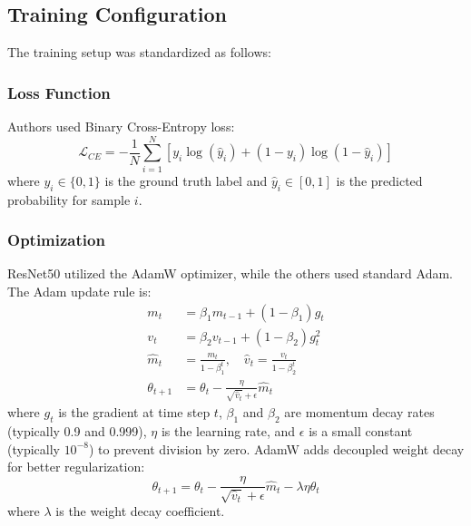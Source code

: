 \documentclass[conference]{IEEEtran}
\begin{document}
\subsection{Training Configuration}
The training setup was standardized as follows:

\subsubsection{Loss Function}
Authors used Binary Cross-Entropy loss:
\begin{equation}
\mathcal{L}_{CE} = -\frac{1}{N}\sum_{i=1}^{N}\left[y_i \log(\hat{y}_i) + (1-y_i)\log(1-\hat{y}_i)\right]
\label{eq:cross_entropy}
\end{equation}
where $y_i \in \{0,1\}$ is the ground truth label and $\hat{y}_i \in [0,1]$ is the predicted probability for sample $i$.

\subsubsection{Optimization}
ResNet50 utilized the AdamW optimizer, while the others used standard Adam. The Adam update rule is:
\begin{align}
m_t &= \beta_1 m_{t-1} + (1-\beta_1) g_t \\
v_t &= \beta_2 v_{t-1} + (1-\beta_2) g_t^2 \\
\hat{m}_t &= \frac{m_t}{1-\beta_1^t}, \quad \hat{v}_t = \frac{v_t}{1-\beta_2^t} \\
\theta_{t+1} &= \theta_t - \frac{\eta}{\sqrt{\hat{v}_t} + \epsilon}\hat{m}_t
\label{eq:adam}
\end{align}
where $g_t$ is the gradient at time step $t$, $\beta_1$ and $\beta_2$ are momentum decay rates (typically 0.9 and 0.999), $\eta$ is the learning rate, and $\epsilon$ is a small constant (typically $10^{-8}$) to prevent division by zero. AdamW adds decoupled weight decay for better regularization:
\begin{equation}
\theta_{t+1} = \theta_t - \frac{\eta}{\sqrt{\hat{v}_t} + \epsilon}\hat{m}_t - \lambda \eta \theta_t
\label{eq:adamw}
\end{equation}
where $\lambda$ is the weight decay coefficient.
\end{document}
